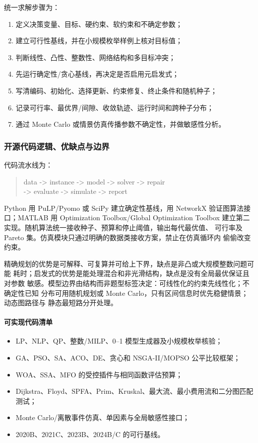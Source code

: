\documentclass[UTF8,a4paper,12pt]{ctexart}
\begin{document}
统一求解步骤为：
\begin{enumerate}
  \item 定义决策变量、目标、硬约束、软约束和不确定参数；
  \item 建立可行性基线，并在小规模枚举样例上核对目标值；
  \item 判断线性、凸性、整数性、网络结构和多目标冲突；
  \item 先运行确定性/贪心基线，再决定是否启用元启发式；
  \item 写清编码、初始化、选择更新、约束修复、终止条件和随机种子；
  \item 记录可行率、最优界/间隙、收敛轨迹、运行时间和跨种子分布；
  \item 通过 Monte Carlo 或情景仿真传播参数不确定性，并做敏感性分析。
\end{enumerate}

\subsubsection{开源代码逻辑、优缺点与边界}

代码流水线为：
\begin{quote}
\small\ttfamily
data -> instance -> model -> solver -> repair\\
-> evaluate -> simulate -> report
\end{quote}
Python 用 PuLP/Pyomo 或 SciPy 建立确定性基线，用
NetworkX 验证图算法接口；MATLAB 用 Optimization Toolbox/Global Optimization
Toolbox 建立第二实现。随机算法统一接收种子、预算和停止阈值，输出每代最优值、
可行率及 Pareto 集。仿真模块只通过明确的数据类接收方案，禁止在仿真循环内
偷偷改变约束。

精确规划的优势是可解释、可复算并可给上下界，缺点是非凸或大规模整数问题可能
耗时；启发式的优势是能处理混合和非光滑结构，缺点是没有全局最优保证且对参数
敏感。模型边界由结构而非题型标签决定：可线性化的约束先线性化；不确定性已知
分布可用随机规划或 Monte Carlo，只有区间信息时优先稳健情景；动态图路径与
静态最短路分开处理。

\paragraph{可实现代码清单}
\begin{itemize}
  \item LP、NLP、QP、整数/MILP、0--1 模型生成器及小规模枚举核验；
  \item GA、PSO、SA、ACO、DE、贪心和 NSGA-II/MOPSO 公平比较框架；
  \item WOA、SSA、MFO 的受控插件与相同函数评估预算；
  \item Dijkstra、Floyd、SPFA、Prim、Kruskal、最大流、最小费用流和二分图匹配测试；
  \item Monte Carlo/离散事件仿真、单因素与全局敏感性接口；
  \item 2020B、2021C、2023B、2024B/C 的可行基线。
\end{itemize}
\end{document}
